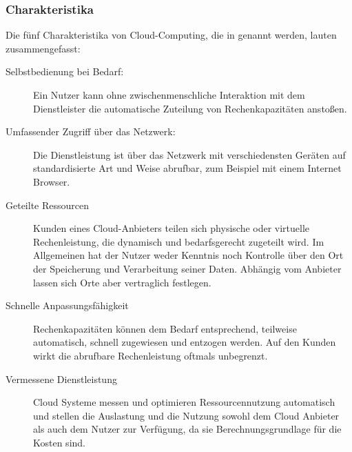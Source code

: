 \subsubsection{Charakteristika}
Die fünf Charakteristika von Cloud-Computing, die in  genannt 
werden, lauten zusammengefasst:

\begin{description}
	\item[Selbstbedienung bei Bedarf:] Ein Nutzer kann ohne 
zwischenmenschliche Interaktion mit dem Dienstleister die automatische 
Zuteilung von Rechenkapazitäten anstoßen.
	\item[Umfassender Zugriff über das Netzwerk:] Die Dienstleistung ist 
über das Netzwerk mit verschiedensten Geräten auf standardisierte Art und Weise 
abrufbar, zum Beispiel mit einem Internet Browser.
	\item[Geteilte Ressourcen] Kunden eines Cloud-Anbieters teilen 
sich physische oder virtuelle Rechenleistung, die dynamisch und bedarfsgerecht 
zugeteilt wird. Im Allgemeinen hat der Nutzer weder Kenntnis noch 
Kontrolle über den Ort der Speicherung und Verarbeitung seiner Daten. Abhängig 
vom Anbieter lassen sich Orte aber vertraglich festlegen. 
	\item[Schnelle Anpassungsfähigkeit] Rechenkapazitäten können dem Bedarf 
entsprechend, teilweise automatisch, schnell zugewiesen und entzogen werden. 
Auf den Kunden wirkt die abrufbare Rechenleistung oftmals unbegrenzt.
	\item[Vermessene Dienstleistung] Cloud Systeme messen und optimieren 
Ressourcennutzung automatisch und stellen die Auslastung und die Nutzung sowohl 
dem Cloud Anbieter als auch dem Nutzer zur Verfügung, da sie 
Berechnungsgrundlage für die Kosten sind.
\end{description}

